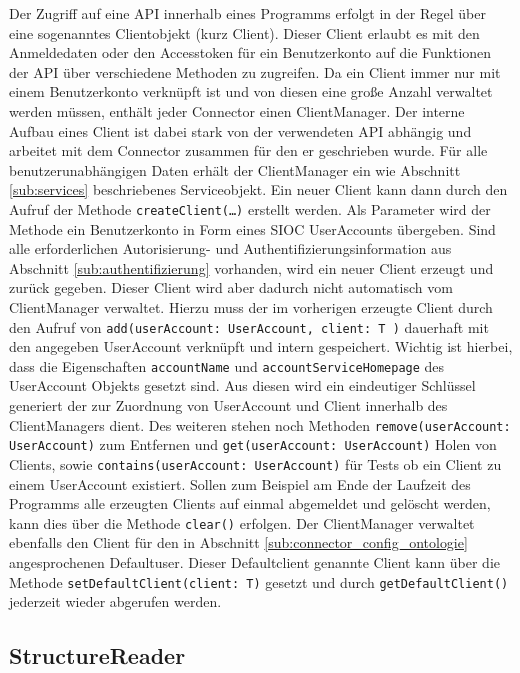 Der Zugriff auf eine API innerhalb eines Programms erfolgt in der Regel über eine sogenanntes Clientobjekt (kurz Client). Dieser Client erlaubt es mit den Anmeldedaten oder den Accesstoken für ein Benutzerkonto auf die Funktionen der API über verschiedene Methoden zu zugreifen. Da ein Client immer nur mit einem Benutzerkonto verknüpft ist und von diesen eine große Anzahl verwaltet werden müssen, enthält jeder Connector einen ClientManager. Der interne Aufbau eines Client ist dabei stark von der verwendeten API abhängig und arbeitet mit dem Connector zusammen für den er geschrieben wurde. Für alle benutzerunabhängigen Daten erhält der ClientManager ein wie Abschnitt \ref{sub:services} beschriebenes Serviceobjekt. Ein neuer Client kann dann durch den Aufruf der Methode \texttt{createClient(\dots)} erstellt werden. Als Parameter wird der Methode ein Benutzerkonto in Form eines SIOC UserAccounts übergeben. Sind alle erforderlichen Autorisierung- und Authentifizierungsinformation aus Abschnitt \ref{sub:authentifizierung} vorhanden, wird ein neuer Client erzeugt und zurück gegeben. Dieser Client wird aber dadurch nicht automatisch vom ClientManager verwaltet. Hierzu muss der im vorherigen erzeugte Client durch den Aufruf von \texttt{add(userAccount: UserAccount, client: T )} dauerhaft mit den angegeben UserAccount verknüpft und intern gespeichert. Wichtig ist hierbei, dass die Eigenschaften \texttt{accountName} und \texttt{accountServiceHomepage} des UserAccount Objekts gesetzt sind. Aus diesen wird ein eindeutiger Schlüssel generiert der zur Zuordnung von UserAccount und Client innerhalb des ClientManagers dient. Des weiteren stehen noch Methoden \texttt{remove(userAccount: UserAccount)} zum Entfernen und \texttt{get(userAccount: UserAccount)} Holen von Clients, sowie \texttt{contains(userAccount: UserAccount)} für Tests ob ein Client zu einem UserAccount existiert. Sollen zum Beispiel am Ende der Laufzeit des Programms alle erzeugten Clients auf einmal abgemeldet und gelöscht werden, kann dies über die Methode \texttt{clear()} erfolgen. Der ClientManager verwaltet ebenfalls den Client für den in Abschnitt \ref{sub:connector_config_ontologie} angesprochenen Defaultuser. Dieser Defaultclient genannte Client kann über die Methode  \texttt{setDefaultClient(client: T)} gesetzt und durch \texttt{getDefaultClient()} jederzeit wieder abgerufen werden. 


\subsection{StructureReader} %
\label{sub:structurereader}

